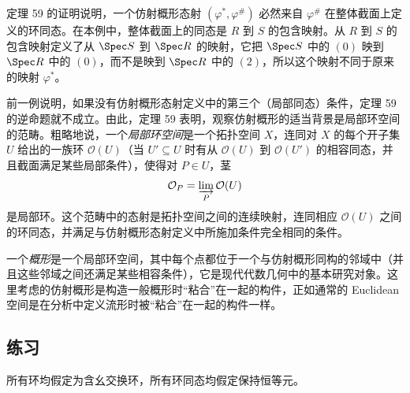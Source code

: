 定理 59 的证明说明，一个仿射概形态射 $(\varphi^*,\varphi^\#)$ 必然来自 $\varphi^\#$ 在整体截面上定义的环同态。在本例中，整体截面上的同态是 $R$ 到 $S$ 的包含映射。从 $R$ 到 $S$ 的包含映射定义了从 $\Spec S$ 到 $\Spec R$ 的映射，它把 $\Spec S$ 中的 $(0)$ 映到 $\Spec R$ 中的 $(0)$，而不是映到 $\Spec R$ 中的 $(2)$，所以这个映射不同于原来的映射 $\varphi^*$。

前一例说明，如果没有仿射概形态射定义中的第三个（局部同态）条件，定理 59 的逆命题就不成立。由此，定理 59 表明，观察仿射概形的适当背景是局部环空间的范畴。粗略地说，一个\emph{局部环空间}是一个拓扑空间 $X$，连同对 $X$ 的每个开子集 $U$ 给出的一族环 $\mathcal O(U)$（当 $U'\subseteq U$ 时有从 $\mathcal O(U)$ 到 $\mathcal O(U')$ 的相容同态，并且截面满足某些局部条件），使得对 $P\in U$，茎
\[
\mathcal O_P=\varinjlim_P\mathcal O(U)
\]
是局部环。这个范畴中的态射是拓扑空间之间的连续映射，连同相应 $\mathcal O(U)$ 之间的环同态，并满足与仿射概形态射定义中所施加条件完全相同的条件。

一个\emph{概形}是一个局部环空间，其中每个点都位于一个与仿射概形同构的邻域中（并且这些邻域之间还满足某些相容条件），它是现代代数几何中的基本研究对象。这里考虑的仿射概形是构造一般概形时“粘合”在一起的构件，正如通常的 Euclidean 空间是在分析中定义流形时被“粘合”在一起的构件一样。

\subsection*{练习}

所有环均假定为含幺交换环，所有环同态均假定保持恒等元。

